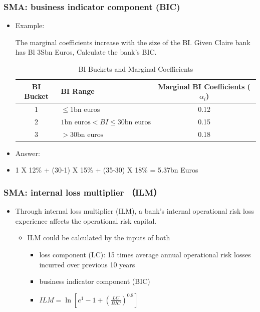 \subsubsection{SMA: business indicator component (BIC)}
\begin{itemize}
\item Example: 

The marginal coefficients increase with the size of the BI. Given Claire bank has Bl 3Sbn Euros, Calculate the bank's BIC.

\begin{table}[h]
    \centering
    \caption{BI Buckets and Marginal Coefficients}
    \renewcommand{\arraystretch}{1.5} %
    \begin{tabular}{|c|l|c|}
        \hline
        \textbf{BI Bucket} & \textbf{BI Range} & \textbf{Marginal BI Coefficients (\(\alpha_i\))} \\
        \hline
        1 & \(\leq 1 \text{bn euros}\) & 0.12 \\
        \hline
        2 & \(1 \text{bn euros} < BI \leq 30 \text{bn euros}\) & 0.15 \\
        \hline
        3 & \(> 30 \text{bn euros}\) & 0.18 \\
        \hline
    \end{tabular}
\end{table}
\item Answer: 
\item 
1 X 12\% + (30-1) X 15\% + (35-30) X 18\% = 5.37bn Euros
\end{itemize}


\subsubsection{SMA: internal loss multiplier （ILM）}
\begin{itemize}
\item Through internal loss multiplier (ILM), a bank's internal operational risk loss experience affects the operational risk capital.
    \begin{itemize}
    \item ILM could be calculated by the inputs of both
        \begin{itemize}
        \item loss component (LC): 15 times average annual operational risk losses incurred over previous 10 years
        \item business indicator component (BIC)
        \item \( ILM = \ln\left[e^1 - 1 + \left(\frac{LC}{BIC}\right)^{0.8}\right] \)
        \end{itemize}
        
    \end{itemize}
\end{itemize}


